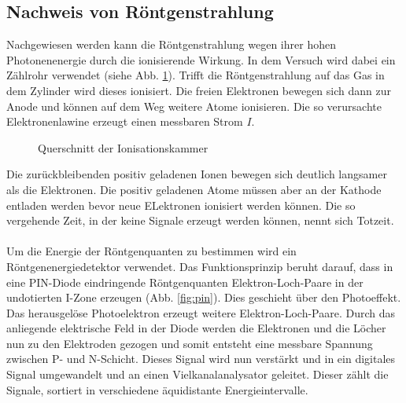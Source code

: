\subsection{Nachweis von Röntgenstrahlung}

Nachgewiesen werden kann die Röntgenstrahlung wegen ihrer hohen Photonenenergie durch die ionisierende Wirkung. In dem Versuch wird dabei ein Zählrohr verwendet (siehe Abb. \ref{fig:rohr}). Trifft die Röntgenstrahlung auf das Gas in dem Zylinder wird dieses ionisiert. Die freien Elektronen bewegen sich dann zur Anode und können auf dem Weg weitere Atome ionisieren. Die so verursachte Elektronenlawine erzeugt einen messbaren Strom $I$. 

\begin{figure}[h]
  \centering
  \caption{Querschnitt der Ionisationskammer}
  \label{fig:rohr}
\end{figure}
Die zurückbleibenden positiv geladenen Ionen bewegen sich deutlich langsamer als die Elektronen. Die positiv geladenen Atome müssen aber an der Kathode entladen werden bevor neue ELektronen ionisiert werden können. Die so vergehende Zeit, in der keine Signale erzeugt werden können, nennt sich Totzeit. \\ \\
Um die Energie der Röntgenquanten zu bestimmen wird ein Röntgenenergiedetektor verwendet. Das Funktionsprinzip beruht darauf, dass in eine PIN-Diode eindringende Röntgenquanten Elektron-Loch-Paare in der undotierten I-Zone erzeugen (Abb. \ref{fig:pin}). Dies geschieht über den Photoeffekt. Das herausgelöse Photoelektron erzeugt weitere Elektron-Loch-Paare. Durch das anliegende elektrische Feld in der Diode werden die Elektronen und die Löcher nun zu den Elektroden gezogen und somit entsteht eine messbare Spannung zwischen P- und N-Schicht. Dieses Signal wird nun verstärkt und in ein digitales Signal umgewandelt und an einen Vielkanalanalysator geleitet. Dieser zählt die Signale, sortiert in verschiedene äquidistante Energieintervalle.

